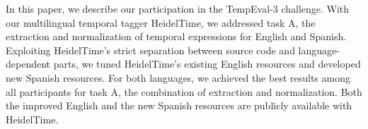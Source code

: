 In this paper, we describe our participation in the TempEval-3 challenge. With our multilingual temporal tagger HeidelTime, we addressed task A, the
 extraction and normalization of temporal expressions for English and Spanish.
 Exploiting HeidelTime's strict separation between source code and
 language-dependent parts, we tuned HeidelTime's existing English resources
 and developed new Spanish resources. For both languages, we achieved the best
 results among all participants for task A, the combination of extraction and
 normalization. Both the improved English and the new Spanish resources are
 publicly available with HeidelTime.

